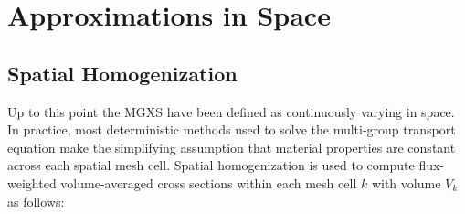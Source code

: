 

\section{Approximations in Space}
\label{sec:chap2-approx-space}

\subsection{Spatial Homogenization}
\label{subsec:chap2-space}



Up to this point the \ac{MGXS} have been defined as continuously varying in space. In practice, most deterministic methods used to solve the multi-group transport equation make the simplifying assumption that material properties are constant across each spatial mesh cell. Spatial homogenization is used to compute flux-weighted volume-averaged cross sections within each mesh cell $k$ with volume $V_{k}$ as follows:

